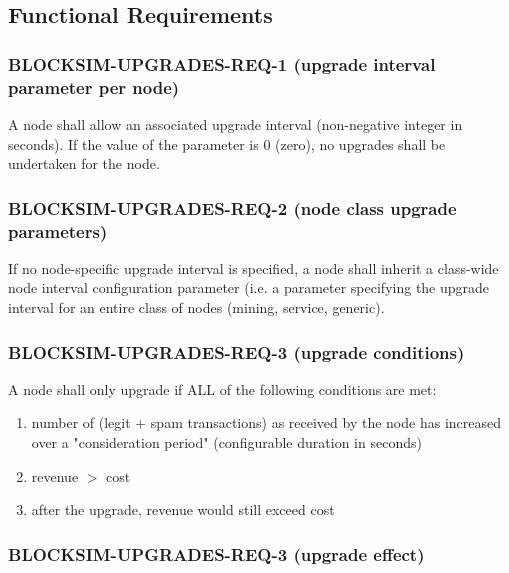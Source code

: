 \documentclass{scrreprt}
\begin{document}
    \subsection{Functional Requirements}

      \subsubsection{BLOCKSIM-UPGRADES-REQ-1 (upgrade interval parameter per node)}

        A node shall allow an associated upgrade interval (non-negative integer
        in seconds).
        If the value of the parameter is 0 (zero), no upgrades shall be
        undertaken for the node.

      \subsubsection{BLOCKSIM-UPGRADES-REQ-2 (node class upgrade parameters)}

        If no node-specific upgrade interval is specified, a node shall inherit
        a class-wide node interval configuration parameter (i.e. a parameter
        specifying the upgrade interval for an entire class of nodes (mining,
        service, generic).

      \subsubsection{BLOCKSIM-UPGRADES-REQ-3 (upgrade conditions)}

        A node shall only upgrade if ALL of the following conditions are met:

        \begin{enumerate}
          \item number of (legit + spam transactions) as received by the node
            has increased over a "consideration period"
            (configurable duration in seconds)

          \item revenue $>$ cost

          \item after the upgrade, revenue would still exceed cost
        \end{enumerate}

      \subsubsection{BLOCKSIM-UPGRADES-REQ-3 (upgrade effect)}
\end{document}
